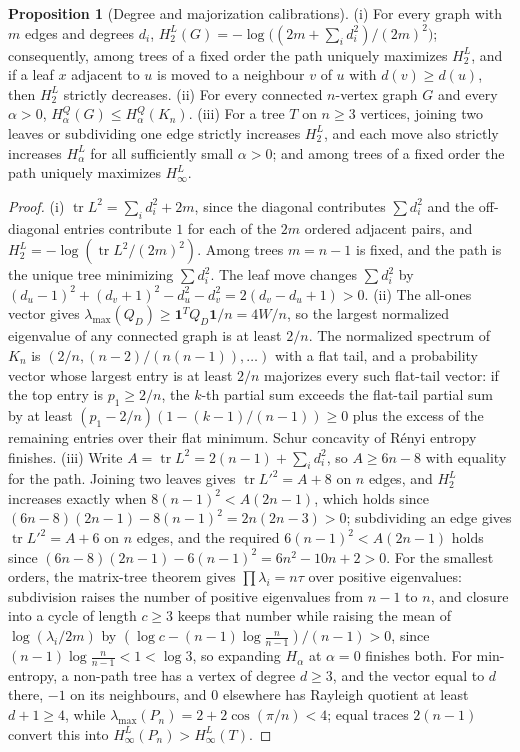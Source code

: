 \documentclass[11pt]{article}
\theoremstyle{definition}
\newtheorem{proposition}{Proposition}
\begin{document}
\begin{proposition}[Degree and majorization calibrations]\label{ab:deg}
(i) For every graph with $m$ edges and degrees $d_i$, $H^L_2(G)=-\log\bigl((2m+\sum_id_i^2)/(2m)^2\bigr)$; consequently, among trees of a fixed order the path uniquely maximizes $H^L_2$, and if a leaf $x$ adjacent to $u$ is moved to a neighbour $v$ of $u$ with $d(v)\ge d(u)$, then $H^L_2$ strictly decreases.  (ii) For every connected $n$-vertex graph $G$ and every $\alpha>0$, $H^Q_\alpha(G)\le H^Q_\alpha(K_n)$.  (iii) For a tree $T$ on $n\ge3$ vertices, joining two leaves or subdividing one edge strictly increases $H^L_2$, and each move also strictly increases $H^L_\alpha$ for all sufficiently small $\alpha>0$; and among trees of a fixed order the path uniquely maximizes $H^L_\infty$.
\end{proposition}

\begin{proof}
(i) $\operatorname{tr}L^2=\sum_id_i^2+2m$, since the diagonal contributes $\sum d_i^2$ and the off-diagonal entries contribute $1$ for each of the $2m$ ordered adjacent pairs, and $H^L_2=-\log(\operatorname{tr}L^2/(2m)^2)$.  Among trees $m=n-1$ is fixed, and the path is the unique tree minimizing $\sum d_i^2$.  The leaf move changes $\sum d_i^2$ by $(d_u-1)^2+(d_v+1)^2-d_u^2-d_v^2=2(d_v-d_u+1)>0$.  (ii) The all-ones vector gives $\lambda_{\max}(Q_D)\ge\mathbf1^TQ_D\mathbf1/n=4W/n$, so the largest normalized eigenvalue of any connected graph is at least $2/n$.  The normalized spectrum of $K_n$ is $(2/n,(n-2)/(n(n-1)),\ldots)$ with a flat tail, and a probability vector whose largest entry is at least $2/n$ majorizes every such flat-tail vector: if the top entry is $p_1\ge2/n$, the $k$-th partial sum exceeds the flat-tail partial sum by at least $(p_1-2/n)(1-(k-1)/(n-1))\ge0$ plus the excess of the remaining entries over their flat minimum.  Schur concavity of R\'enyi entropy finishes.  (iii) Write $A=\operatorname{tr}L^2=2(n-1)+\sum_id_i^2$, so $A\ge6n-8$ with equality for the path.  Joining two leaves gives $\operatorname{tr}L'^2=A+8$ on $n$ edges, and $H^L_2$ increases exactly when $8(n-1)^2<A(2n-1)$, which holds since $(6n-8)(2n-1)-8(n-1)^2=2n(2n-3)>0$; subdividing an edge gives $\operatorname{tr}L'^2=A+6$ on $n$ edges, and the required $6(n-1)^2<A(2n-1)$ holds since $(6n-8)(2n-1)-6(n-1)^2=6n^2-10n+2>0$.  For the smallest orders, the matrix-tree theorem gives $\prod\lambda_i=n\tau$ over positive eigenvalues: subdivision raises the number of positive eigenvalues from $n-1$ to $n$, and closure into a cycle of length $c\ge3$ keeps that number while raising the mean of $\log(\lambda_i/2m)$ by $(\log c-(n-1)\log\frac n{n-1})/(n-1)>0$, since $(n-1)\log\frac n{n-1}<1<\log3$, so expanding $H_\alpha$ at $\alpha=0$ finishes both.  For min-entropy, a non-path tree has a vertex of degree $d\ge3$, and the vector equal to $d$ there, $-1$ on its neighbours, and $0$ elsewhere has Rayleigh quotient at least $d+1\ge4$, while $\lambda_{\max}(P_n)=2+2\cos(\pi/n)<4$; equal traces $2(n-1)$ convert this into $H^L_\infty(P_n)>H^L_\infty(T)$.
\end{proof}
\end{document}
